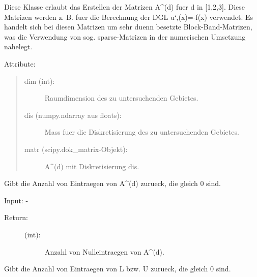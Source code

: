 \documentclass[letterpaper,10pt,ngerman]{sphinxmanual}
\begin{document}
\begin{fulllineitems}
\label{\detokenize{index:sparse_erw.Sparse}}
Diese Klasse erlaubt das Erstellen der Matrizen A\textasciicircum{}(d) fuer d in {[}1,2,3{]}. Diese Matrizen werden
z. B. fuer die Berechnung der DGL u‘‚(x)=-f(x) verwendet. Es handelt sich bei diesen Matrizen
um sehr duenn besetzte Block-Band-Matrizen, was die Verwendung von sog. sparse-Matrizen
in der numerischen Umsetzung nahelegt.

Attribute:
\begin{quote}
\begin{description}
\item[{dim (int):}] \leavevmode
Raumdimension des zu untersuchenden Gebietes.

\item[{dis (numpy.ndarray aus floats):}] \leavevmode
Mass fuer die Diskretisierung des zu untersuchenden Gebietes.

\item[{matr (scipy.dok\_matrix-Objekt):}] \leavevmode
A\textasciicircum{}(d) mit Diskretisierung dis.

\end{description}
\end{quote}

\begin{fulllineitems}
\label{\detokenize{index:sparse_erw.Sparse.anz_n_abs}}
Gibt die Anzahl von Eintraegen von A\textasciicircum{}(d) zurueck, die gleich 0 sind.

Input: -
\begin{description}
\item[{Return:}] \leavevmode\begin{description}
\item[{(int):}] \leavevmode
Anzahl von Nulleintraegen von A\textasciicircum{}(d).

\end{description}

\end{description}

\end{fulllineitems}


\begin{fulllineitems}
\label{\detokenize{index:sparse_erw.Sparse.anz_n_lu_abs}}
Gibt die Anzahl von Eintraegen von L bzw. U zurueck, die gleich 0 sind.


\end{fulllineitems}
\end{fulllineitems}
\end{document}
